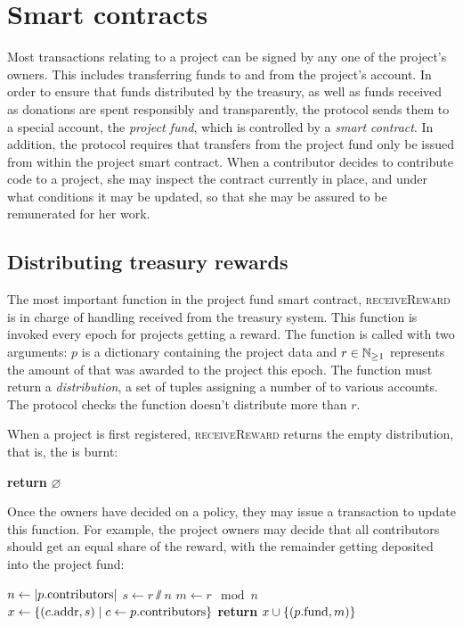 
\section{Smart contracts}
\label{s:smart-contracts}

\newcommand{\handler}[1]{\textsc{\small#1}}

Most transactions relating to a project can be signed by any one of the
project's owners. This includes transferring funds to and from the project's
account. In order to ensure that funds distributed by the \oscoin{} treasury,
as well as funds received as donations are spent responsibly and transparently,
the protocol sends them to a special account, the \emph{project fund}, which is
controlled by a \emph{smart contract}. In addition, the protocol requires that
transfers from the project fund only be issued from within the project smart
contract. When a contributor decides to contribute code to a project, she may
inspect the contract currently in place, and under what conditions it may be
updated, so that she may be assured to be remunerated for her work.

\subsection{Distributing treasury rewards}

The most important function in the project fund smart contract,
\handler{receiveReward} is in charge of handling \oscoin{} received from the
treasury system. This function is invoked every epoch for projects getting a
reward. The function is called with two arguments: $p$ is a dictionary
containing the project data and $r \in \mathbb{N}_{\geq 1}$ represents the amount of
\oscoin{} that was awarded to the project this epoch. The function must return
a \emph{distribution}, a set of tuples assigning a number of \oscoin{} to
various accounts. The protocol checks the function doesn't distribute more than
$r$.

When a project is first registered, \handler{receiveReward} returns the empty
distribution, that is, the \oscoin{} is burnt:
\begin{algorithmic}[0]
        \State \textbf{return} $\varnothing$
    \EndProcedure
\end{algorithmic}

Once the owners have decided on a policy, they may issue a transaction to update
this function. For example, the project owners may decide that all contributors
should get an equal share of the reward, with the remainder getting deposited
into the project fund:
\medskip
\begin{algorithmic}[0]
        \State $n \gets |p.{\mathrm{contributors}}|$
        \State $s \gets r \sslash n$
        \State $m \gets r \mod n$
        \State $x \gets \{ (c.{\mathrm{addr}}, s) \mid c \gets p.{\mathrm{contributors}} \}$
        \State \textbf{return} $x \cup \{ (p.{\mathrm{fund}}, m) \}$
    \EndProcedure
\end{algorithmic}

